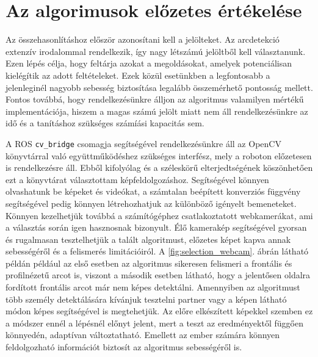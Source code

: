 \section{Az algorimusok előzetes értékelése}
Az összehasonlításhoz először azonosítani kell a jelölteket. Az arcdetekció extenzív irodalommal rendelkezik, így nagy létszámú jelöltből kell választanunk. Ezen lépés célja, hogy feltárja azokat a megoldásokat, amelyek potenciálisan kielégítik az adott feltételeket. Ezek közül esetünkben a legfontosabb a jelenleginél nagyobb sebesség biztosítása legalább összemérhető pontosság mellett. Fontos továbbá, hogy rendelkezésünkre álljon az algoritmus valamilyen mértékű implementációja, hiszem a magas számú jelölt miatt nem áll rendelkezésünkre az idő és a tanításhoz szükséges számíási kapacitás sem.

A ROS \lstinline{cv_bridge} csomagja segítségével rendelkezésünkre áll az OpenCV\cite{noauthor_opencvopencv_2021} könyvtárral való együttműködéshez szükséges interfész, mely a roboton előzetesen is rendelkezésre áll. Ebből kifolyólag és a széleskörű elterjedtségének köszönhetően ezt a könyvtárat választottam képfeldolgozáshoz. Segítségével könnyen olvashatunk be képeket és videókat, a számtalan beépített konverziós függvény segítségével pedig könnyen létrehozhatjuk az különböző igényelt bemeneteket. Könnyen kezelhetjük továbbá a számítógéphez csatlakoztatott webkamerákat, ami a választás során igen hasznosnak bizonyult. Élő kamerakép segítségével gyorsan és rugalmasan tesztelhetjük a talált algoritmust, előzetes képet kapva annak sebességéről és a felismerés limitációiról. A \ref{fig:selection_webcam}. ábrán látható példán például az első esetben az algoritmus sikeresen felismeri a frontális és profilnézetű arcot is, viszont a második esetben látható, hogy a jelentősen oldalra fordított frontális arcot már nem képes detektálni. Amennyiben az algoritmust több személy detektálására kívánjuk tesztelni partner vagy a képen látható módon képes segítségével is megtehetjük. Az előre elkészített képekkel szemben ez a módszer ennél a lépésnél előnyt jelent, mert a teszt az eredményektől függően könnyedén, adaptívan változtatható. Emellett az ember számára könnyen feldolgozható információt biztosít az algoritmus sebességéről is.

